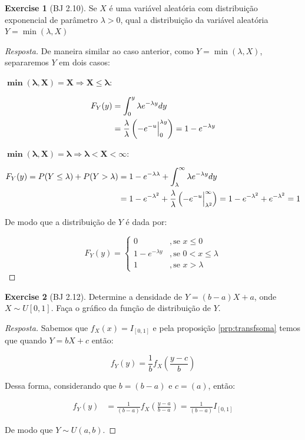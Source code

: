 \documentclass[
]{article}
\theoremstyle{definition}
\theoremstyle{definition}
\theoremstyle{definition}
\newtheorem{exercise}{Exercise}[section]
\theoremstyle{definition}
\theoremstyle{remark}
\begin{document}
\begin{exercise}[BJ 2.10]
Se \(X\) é uma variável aleatória com distribuição exponencial de parâmetro \(\lambda > 0\), qual a distribuição da variável aleatória \(Y = \min(\lambda, X)\)
\end{exercise}

\begin{proof}[Resposta]
De maneira similar ao caso anterior, como \(Y = \min(\lambda,X)\), separaremos \(Y\) em dois casos:

\(\mathbf{\min(\lambda,X) = X} \Rightarrow \mathbf{X \le \lambda}\):

\begin{align*}
F_{Y}(y) &= \int_{0}^{y}\lambda e^{-\lambda y}dy \\
&= \frac{\lambda}{\lambda}\left(-e^{-u}\Big{|}_{0}^{\lambda y}\right) = 1 - e^{-\lambda y}
\end{align*}

\(\mathbf{\min(\lambda,X) = \lambda} \Rightarrow \mathbf{\lambda < X < \infty}\):

\begin{align*}
F_{Y}(y) = P(Y \le \lambda) + P(Y > \lambda) &= 1 - e^{-\lambda \lambda} + \int_{\lambda}^{\infty}\lambda e^{-\lambda y}dy \\
&=  1 - e^{-\lambda^{2}} + \frac{\lambda}{\lambda}\left(-e^{-u}\Big{|}_{\lambda^{2}}^{\infty}\right) = 1 - e^{-\lambda^{2}} + e^{-\lambda^{2}} = 1
\end{align*}

De modo que a distribuição de \(Y\) é dada por:

\begin{equation*}
F_{Y}(y) = \begin{cases}
0 &,\text{se } x \le 0 \\
1 - e^{-\lambda y} &,\text{se } 0 < x \le \lambda \\
1 &,\text{se } x > \lambda
\end{cases}
\end{equation*}
\end{proof}

\begin{exercise}[BJ 2.12]
Determine a densidade de \(Y = (b-a)X + a\), onde \(X \sim U[0,1]\). Faça o gráfico da função de distribuição de \(Y\).
\end{exercise}

\begin{proof}[Resposta]
Sabemos que \(f_{X}(x) = I_{[0,1]}\) e pela proposição \ref{prp:transfsoma} temos que quando \(Y = bX + c\) então:

\begin{equation*}
f_{Y}(y) = \frac{1}{b}f_{X}\left(\frac{y - c}{b}\right)
\end{equation*}

Dessa forma, considerando que \(b = (b-a)\) e \(c = (a)\), então:

\begin{align*}
f_{Y}(y) &= \frac{1}{(b-a)}f_{X}\left(\frac{y-a}{b-a}\right) = \frac{1}{(b-a)}I_{[0,1]}
\end{align*}

De modo que \(Y \sim U(a,b)\).
\end{proof}
\end{document}

